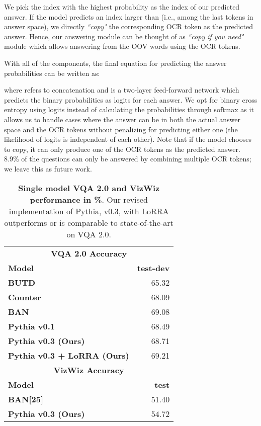 \documentclass[10pt,twocolumn,letterpaper]{article}
\begin{document}
We pick the index with the highest probability  as the index of our predicted answer. If the model predicts an index larger than  (i.e., among the last  tokens in answer space), we directly \textit{``copy"} the corresponding OCR token as the predicted answer. Hence, our answering module can be thought of as \textit{``copy if you need"} module which allows answering from the OOV words using the OCR tokens.

With all of the components, the final equation  for predicting the answer probabilities
can be written as: 

where  refers to concatenation and  is a two-layer feed-forward network which predicts the binary probabilities as logits for each answer. We opt for binary cross entropy using logits instead of calculating the probabilities through softmax as it allows us to handle cases where the answer can be in both the actual answer space and the OCR tokens without penalizing for predicting either one (the likelihood of logits is independent of each other). Note that if the model chooses to copy, it can only produce one of the OCR tokens as the predicted answer. 8.9\% of the \datasetName questions can only be answered by combining multiple OCR tokens; we leave this as future work.

\begin{table}[t]
\centering
\setlength\tabcolsep{8pt}
\footnotesize
\renewcommand{\arraystretch}{1.2}
\begin{tabular}{@{}p{4.9cm}r@{}}
\toprule
\multicolumn{2}{c}{\textbf{VQA 2.0 Accuracy}} \\
\textbf{Model} & \textbf{test-dev}
\\
\midrule
\textbf{BUTD~\cite{anderson2017bottom}}                                 & 65.32  
\\
\textbf{Counter~\cite{zhang2018counting}}                        & 68.09 
\\  
\textbf{BAN \cite{kim2018bilinear}}               & 69.08 

\\
\textbf{Pythia v0.1 \cite{jiang2018pythia}}                                  & 68.49 
\\
\textbf{Pythia v0.3 (Ours)}                                                           & 68.71
\\
\textbf{Pythia v0.3 + LoRRA (Ours)}                                                           & 69.21
\\
\midrule
\multicolumn{2}{c}{\textbf{VizWiz Accuracy}} \\
\textbf{Model} & \textbf{test}  \\
\midrule
\textbf{BAN[25]} & 51.40 \\
\textbf{Pythia v0.3 (Ours)} & 54.72 \\
\bottomrule

\end{tabular}
\caption{\textbf{Single model VQA 2.0 and VizWiz performance in \%}. 
Our revised implementation of Pythia, v0.3, with LoRRA outperforms or is comparable to state-of-the-art on VQA 2.0.}
\vspace{-6mm}
\label{tab:vqaaccuracy}
\end{table}
\end{document}
